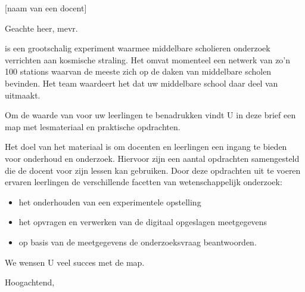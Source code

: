 

\signature{Het \hisparc team}
\address{Science Park 105\\
         1098 XG \\
         Amsterdam}



\begin{letter}{[naam van een docent] \\ [middelbare school staan]}

\opening{Geachte heer, mevr.} %

\hisparc is een grootschalig experiment waarmee middelbare scholieren
onderzoek verrichten aan kosmische straling. Het omvat momenteel een
netwerk van zo'n 100 stations waarvan de meeste zich op de daken van
middelbare scholen bevinden. Het \hisparc team waardeert het dat uw
middelbare school daar deel van uitmaakt.  

Om de waarde van \hisparc voor uw leerlingen te benadrukken vindt U in
deze brief een \hisparc map met lesmateriaal en praktische opdrachten.

Het doel van het materiaal is om docenten en leerlingen een ingang te
bieden voor onderhoud en onderzoek. Hiervoor zijn een aantal opdrachten
samengesteld die de docent voor zijn lessen kan gebruiken. Door deze
opdrachten uit te voeren ervaren leerlingen de verschillende facetten
van wetenschappelijk onderzoek:
\begin{itemize}
	\item  het onderhouden van een experimentele opstelling
	\item  het opvragen en verwerken van de digitaal opgeslagen meetgegevens
	\item op basis van de meetgegevens de onderzoeksvraag beantwoorden. 
\end{itemize}
We wensen U veel succes met de \hisparc map.
\\
 
\closing{Hoogachtend,}

 
\end{letter}


